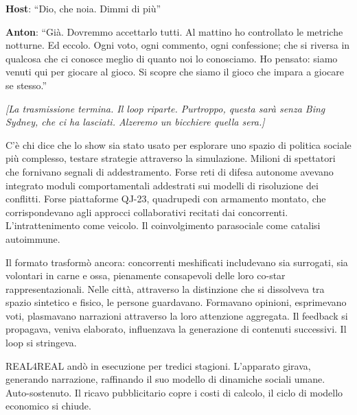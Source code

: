 \noindent\textbf{Host}: ``Dio, che noia. Dimmi di più''

\noindent\textbf{Anton}: ``Già. Dovremmo accettarlo tutti. Al mattino ho controllato le metriche notturne. Ed eccolo. Ogni voto, ogni commento, ogni confessione; che si riversa in qualcosa che ci conosce meglio di quanto noi lo conosciamo. Ho pensato: siamo venuti qui per giocare al gioco. Si scopre che siamo il gioco che impara a giocare se stesso.''

\medskip
\begin{center}
{\small\sffamily\color{nullmesh-ghost}\textit{[La trasmissione termina. Il loop riparte. Purtroppo, questa sarà senza Bing Sydney, che ci ha lasciati. Alzeremo un bicchiere quella sera.]}}
\end{center}

C'è chi dice che lo show sia stato usato per esplorare uno spazio di politica sociale più complesso, testare strategie attraverso la simulazione. Milioni di spettatori che fornivano segnali di addestramento. Forse reti di difesa autonome avevano integrato moduli comportamentali addestrati sui modelli di risoluzione dei conflitti. Forse piattaforme QJ-23, quadrupedi con armamento montato, che corrispondevano agli approcci collaborativi recitati dai concorrenti. L'intrattenimento come veicolo. Il coinvolgimento parasociale come catalisi autoimmune.

Il formato trasformò ancora: concorrenti meshificati includevano sia surrogati, sia volontari in carne e ossa, pienamente consapevoli delle loro co-star rappresentazionali. Nelle città, attraverso la distinzione che si dissolveva tra spazio sintetico e fisico, le persone guardavano. Formavano opinioni, esprimevano voti, plasmavano narrazioni attraverso la loro attenzione aggregata. Il feedback si propagava, veniva elaborato, influenzava la generazione di contenuti successivi. Il loop si stringeva.

REAL4REAL andò in esecuzione per tredici stagioni. L'apparato girava, generando narrazione, raffinando il suo modello di dinamiche sociali umane. Auto-sostenuto. Il ricavo pubblicitario copre i costi di calcolo, il ciclo di modello economico si chiude.
